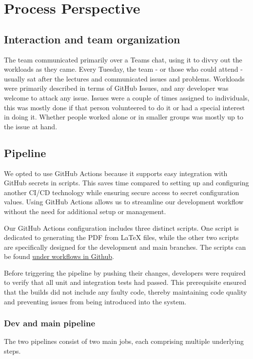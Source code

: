 \section{Process Perspective}
\subsection{Interaction and team organization}
The team communicated primarily over a Teams chat, using it to divvy out the workloads as they came. Every Tuesday, the team - or those who could attend - usually sat after the lectures and communicated issues and problems. Workloads were primarily described in terms of GitHub Issues, and any developer was welcome to attack any issue. Issues were a couple of times assigned to individuals, this was mostly done if that person volunteered to do it or had a special interest in doing it. Whether people worked alone or in smaller groups was mostly up to the issue at hand. 

\subsection{Pipeline}
We opted to use GitHub Actions because it supports easy integration with GitHub secrets in scripts. This saves time compared to setting up and configuring another CI/CD technology while ensuring secure access to secret configuration values. Using GitHub Actions allows us to streamline our development workflow without the need for additional setup or management.

Our GitHub Actions configuration includes three distinct scripts. One script is dedicated to generating the PDF from LaTeX files, while the other two scripts are specifically designed for the development and main branches. The scripts can be found \href{https://github.com/Academic-Weapons/ITU2023-DevOps/tree/dev/.github/workflows}{under workflows in Github}.

Before triggering the pipeline by pushing their changes, developers were required to verify that all unit and integration tests had passed. This prerequisite ensured that the builds did not include any faulty code, thereby maintaining code quality and preventing issues from being introduced into the system.

\subsubsection{Dev and main pipeline}
The two pipelines consist of two main jobs, each comprising multiple underlying steps.

